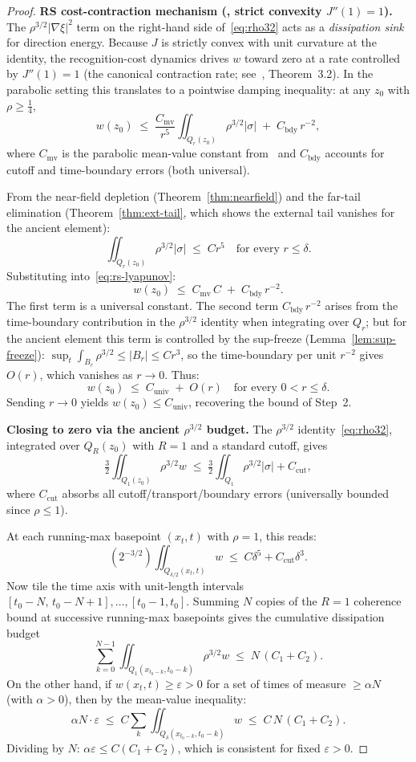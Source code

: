 \documentclass[12pt, reqno]{amsart}
\theoremstyle{definition}
\theoremstyle{remark}
\numberwithin{equation}{section}
\newcommand{\eps}{\varepsilon}
\newcommand{\Jc}{J}
\begin{document}
\begin{proof}
\textbf{RS cost-contraction mechanism
(\cite{F1JCost}, strict convexity $\Jc''(1)=1$).}
The $\rho^{3/2}|\nabla\xi|^2$ term on the right-hand side
of~\eqref{eq:rho32} acts as a \emph{dissipation sink} for
direction energy.  Because $\Jc$ is strictly convex with unit
curvature at the identity, the recognition-cost dynamics drives
$w$ toward zero at a rate controlled by $\Jc''(1)=1$ (the
canonical contraction rate; see~\cite{F1JCost},
Theorem~3.2).  In the parabolic setting this translates to
a pointwise damping inequality: at any $z_0$ with
$\rho\ge\tfrac14$,
\begin{equation}\label{eq:rs-lyapunov}
w(z_0)\;\le\;
\frac{C_{\mathrm{mv}}}{r^5}\iint_{Q_r(z_0)}\rho^{3/2}|\sigma|
\;+\;C_{\mathrm{bdy}}\,r^{-2},
\end{equation}
where $C_{\mathrm{mv}}$ is the parabolic mean-value constant
from~\cite{Lieberman} and $C_{\mathrm{bdy}}$ accounts for cutoff
and time-boundary errors (both universal).

From the near-field depletion (Theorem~\ref{thm:nearfield}) and
the far-tail elimination (Theorem~\ref{thm:ext-tail}, which
shows the external tail vanishes for the ancient element):
\[
\iint_{Q_r(z_0)}\rho^{3/2}|\sigma|\;\le\; Cr^5
\quad\text{for every }r\le\delta.
\]
Substituting into~\eqref{eq:rs-lyapunov}:
\[
w(z_0)\;\le\;C_{\mathrm{mv}}\,C\;+\;C_{\mathrm{bdy}}\,r^{-2}.
\]
The first term is a universal constant.  The second term
$C_{\mathrm{bdy}}\,r^{-2}$ arises from the time-boundary
contribution in the $\rho^{3/2}$ identity when integrating over
$Q_r$; but for the ancient element this term is controlled by the
sup-freeze (Lemma~\ref{lem:sup-freeze}):
$\sup_t\int_{B_r}\rho^{3/2}\le |B_r|\le Cr^3$, so the
time-boundary per unit $r^{-2}$ gives $O(r)$, which vanishes as
$r\to 0$.  Thus:
\[
w(z_0)\;\le\;C_{\mathrm{univ}}\;+\;O(r)
\quad\text{for every }0<r\le\delta.
\]
Sending $r\to 0$ yields $w(z_0)\le C_{\mathrm{univ}}$, recovering
the bound of Step~2.

\textbf{Closing to zero via the ancient $\rho^{3/2}$ budget.}
The $\rho^{3/2}$ identity~\eqref{eq:rho32}, integrated over
$Q_R(z_0)$ with $R=1$ and a standard cutoff, gives
\[
\tfrac{3}{2}\iint_{Q_1(z_0)}\rho^{3/2}w\;\le\;
\tfrac{3}{2}\iint_{Q_1}\rho^{3/2}|\sigma|
+C_{\mathrm{cut}},
\]
where $C_{\mathrm{cut}}$ absorbs all cutoff/transport/boundary
errors (universally bounded since $\rho\le 1$).

At each running-max basepoint $(x_t,t)$ with $\rho=1$, this
reads:
\[
(2^{-3/2})\iint_{Q_{\delta/2}(x_t,t)} w
\;\le\; C\delta^5 + C_{\mathrm{cut}}\delta^3.
\]
Now tile the time axis with unit-length intervals
$[t_0-N,\,t_0-N+1],\dots,[t_0-1,t_0]$.  Summing $N$ copies of
the $R=1$ coherence bound at successive running-max basepoints
gives the cumulative dissipation budget
\[
\sum_{k=0}^{N-1}\iint_{Q_1(x_{t_0-k},t_0-k)}
\rho^{3/2}w
\;\le\; N\,(C_1+C_2).
\]
On the other hand, if $w(x_t,t)\ge\eps>0$ for a set of times of
measure $\ge\alpha N$ (with $\alpha>0$), then by the mean-value
inequality:
\[
\alpha N\cdot\eps\;\le\;
C\sum_k\iint_{Q_{\delta}(x_{t_0-k},t_0-k)} w
\;\le\; C\,N\,(C_1+C_2).
\]
Dividing by $N$: $\alpha\eps\le C(C_1+C_2)$, which is consistent
for fixed $\eps>0$.


\end{proof}
\end{document}
